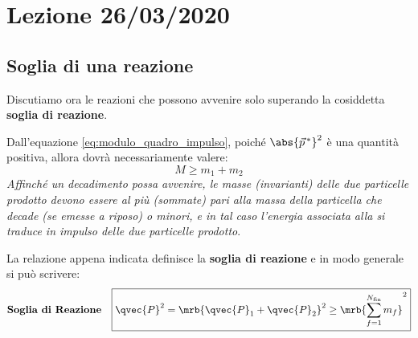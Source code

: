 \chapter{Lezione 26/03/2020}
\section{Soglia di una reazione}
Discutiamo ora le reazioni che possono avvenire solo superando la cosiddetta
\textbf{soglia di reazione}.

Dall'equazione \ref{eq:modulo_quadro_impulso}, poiché
$\abs{\vec{p}^{\,\ast}}^2$ è una quantità positiva, allora dovrà
necessariamente valere:
\begin{equation}
	M \geq m_1 + m_2
\end{equation}
\textit{Affinché un decadimento possa avvenire, le masse (invarianti) delle due
	particelle prodotto devono essere al più (sommate) pari alla massa della
	particella che decade (se emesse a riposo) o minori, e in tal caso l'energia
	associata alla  si traduce in impulso delle due
	particelle prodotto}.

La relazione appena indicata definisce la \textbf{soglia di reazione} e in
modo generale si può scrivere:
\begin{align}
	\textbf{Soglia di Reazione}
	\quad
	\boxed{
	\qvec{P}^2 = \mrb{\qvec{P}_1 + \qvec{P}_2}^2 \geq
	\mrb{\sum_{f=1}^{N_\text{fin}} m_f}^2
	}
	\label{eq:soglia_reazione}
\end{align}

